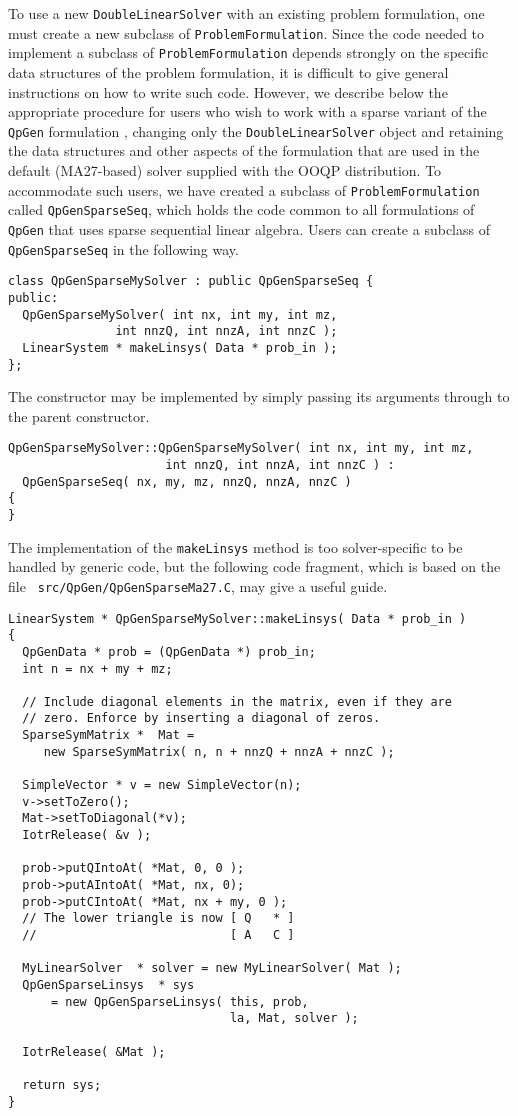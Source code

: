 To use a new \texttt{DoubleLinearSolver} with an existing problem
formulation, one must create a new subclass of
\texttt{ProblemFormulation}. Since the code needed to implement a
subclass of \texttt{ProblemFormulation} depends strongly on the
specific data structures of the problem formulation, it is difficult
to give general instructions on how to write such code. However, we
describe below the appropriate procedure for users who wish to work
with a sparse variant of the {\tt QpGen} formulation ,
changing only the {\tt DoubleLinearSolver} object and retaining the
data structures and other aspects of the formulation that are used in
the default (MA27-based) solver supplied with the OOQP
distribution. To accommodate such users, we have created a subclass of
\texttt{ProblemFormulation} called \texttt{QpGenSparseSeq}, which
holds the code common to all formulations of \texttt{QpGen} that uses
sparse sequential linear algebra.  Users can create a subclass of
\texttt{QpGenSparseSeq} in the following way.
\begin{verbatim}
class QpGenSparseMySolver : public QpGenSparseSeq {
public:
  QpGenSparseMySolver( int nx, int my, int mz,
               int nnzQ, int nnzA, int nnzC );
  LinearSystem * makeLinsys( Data * prob_in );
};
\end{verbatim}
The constructor may be implemented by simply passing its arguments
through to the parent constructor.
\begin{verbatim}
QpGenSparseMySolver::QpGenSparseMySolver( int nx, int my, int mz,
                      int nnzQ, int nnzA, int nnzC ) :
  QpGenSparseSeq( nx, my, mz, nnzQ, nnzA, nnzC )
{
}
\end{verbatim}
The implementation of the \texttt{makeLinsys} method is too
solver-specific to be handled by generic code, but the following code
fragment, which is based on the file {\tt
src/QpGen/QpGenSparseMa27.C}, may give a useful guide.
\begin{verbatim}
LinearSystem * QpGenSparseMySolver::makeLinsys( Data * prob_in )
{
  QpGenData * prob = (QpGenData *) prob_in;
  int n = nx + my + mz;

  // Include diagonal elements in the matrix, even if they are
  // zero. Enforce by inserting a diagonal of zeros.
  SparseSymMatrix *  Mat = 
     new SparseSymMatrix( n, n + nnzQ + nnzA + nnzC );

  SimpleVector * v = new SimpleVector(n);  
  v->setToZero();
  Mat->setToDiagonal(*v);                  
  IotrRelease( &v );

  prob->putQIntoAt( *Mat, 0, 0 );
  prob->putAIntoAt( *Mat, nx, 0);
  prob->putCIntoAt( *Mat, nx + my, 0 );
  // The lower triangle is now [ Q   * ]
  //                           [ A   C ]
  
  MyLinearSolver  * solver = new MyLinearSolver( Mat );
  QpGenSparseLinsys  * sys 
      = new QpGenSparseLinsys( this, prob, 
                               la, Mat, solver );

  IotrRelease( &Mat );

  return sys;
}
\end{verbatim}

